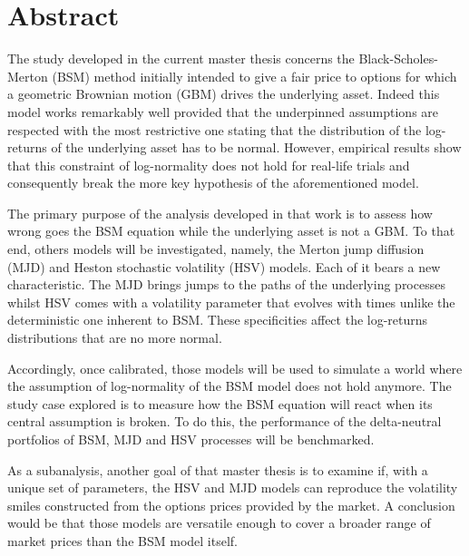 \documentclass[a4paper, 12pt]{report}
\begin{document}


\begin{titlepage}

\end{titlepage}

\newpage\null\thispagestyle{empty}\newpage





\chapter*{Abstract}
 
The study developed in the current master thesis concerns the Black-Scholes-Merton (BSM) method initially intended to give a fair price to options for which a geometric Brownian motion (GBM) drives the underlying asset.
Indeed this model works remarkably well provided that the underpinned assumptions are respected with the most restrictive one stating that the distribution of the log-returns of the underlying asset has to be normal.
However, empirical results show that this constraint of log-normality does not hold for real-life trials and consequently break the more key hypothesis of the aforementioned model.

The primary purpose of the analysis developed in that work is to assess how wrong goes the BSM equation while the underlying asset is not a GBM.
To that end, others models will be investigated, namely, the Merton jump diffusion (MJD) and Heston stochastic volatility (HSV) models.
Each of it bears a new characteristic. The MJD brings jumps to the paths of the underlying processes whilst HSV comes with a volatility parameter that evolves with times unlike the deterministic one inherent to BSM. These specificities affect the log-returns distributions that are no more normal.

Accordingly, once calibrated, those models will be used to simulate a world where the assumption of log-normality of the BSM model does not hold anymore. The study case explored is to measure how the BSM equation will react when its central assumption is broken.
To do this, the performance of the delta-neutral portfolios of BSM, MJD and HSV processes will be benchmarked.

As a subanalysis, another goal of that master thesis is to examine if, with a unique set of parameters, the HSV and MJD models can reproduce the volatility smiles constructed from the options prices provided by the market.
A conclusion would be that those models are versatile enough to cover a broader range of market prices than the BSM model itself.
\end{document}
